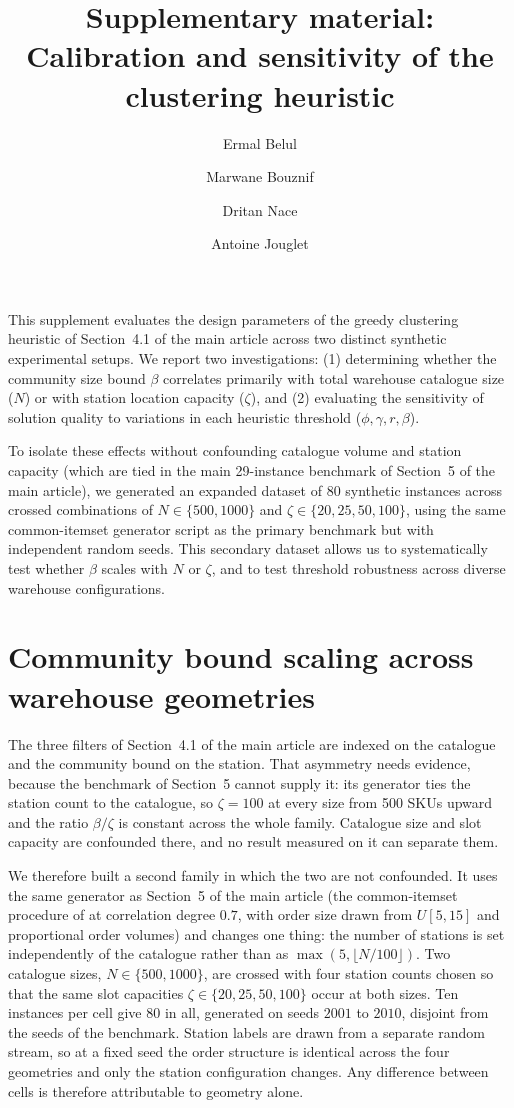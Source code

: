 \documentclass[11pt]{article}
\title{Supplementary material:\\
Calibration and sensitivity of the clustering heuristic}
\author{Ermal Belul \and Marwane Bouznif \and Dritan Nace \and Antoine Jouglet}
\date{}
\begin{document}
\maketitle

\noindent
This supplement evaluates the design parameters of the greedy clustering heuristic of
Section~4.1 of the main article across two distinct synthetic experimental setups. We report
two investigations: (1) determining whether the community size bound $\beta$ correlates
primarily with total warehouse catalogue size ($N$) or with station location capacity
($\zeta$), and (2) evaluating the sensitivity of solution quality to variations in each
heuristic threshold ($\phi, \gamma, r, \beta$).

To isolate these effects without confounding catalogue volume and station capacity (which are
tied in the main 29-instance benchmark of Section~5 of the main article), we generated an
expanded dataset of 80 synthetic instances across crossed combinations of $N \in \{500, 1000\}$
and $\zeta \in \{20, 25, 50, 100\}$, using the same common-itemset generator script as the
primary benchmark but with independent random seeds. This secondary dataset allows us to
systematically test whether $\beta$ scales with $N$ or $\zeta$, and to test threshold
robustness across diverse warehouse configurations.

\section{Community bound scaling across warehouse geometries}\label{sup:capsweep}
The three filters of Section~4.1 of the main article are indexed on the catalogue and the
community bound on the station. That asymmetry needs evidence, because the benchmark of
Section~5 cannot supply it: its generator ties the station count to the catalogue, so
$\zeta=100$ at every size from 500 SKUs upward and the ratio $\beta/\zeta$ is constant across
the whole family. Catalogue size and slot capacity are confounded there, and no result measured
on it can separate them.

We therefore built a second family in which the two are not confounded. It uses the same
generator as Section~5 of the main article (the common-itemset procedure of
\citet{zhang2019cie} at correlation degree $0.7$, with order size drawn from $U[5,15]$ and
proportional order volumes) and changes one thing: the number of stations is set independently
of the catalogue rather than as $\max(5,\lfloor N/100\rfloor)$. Two catalogue sizes,
$N\in\{500,1000\}$, are crossed with four station counts chosen so that the same slot
capacities $\zeta\in\{20,25,50,100\}$ occur at both sizes. Ten instances per cell give 80 in
all, generated on seeds $2001$ to $2010$, disjoint from the seeds of the benchmark. Station
labels are drawn from a separate random stream, so at a fixed seed the order structure is
identical across the four geometries and only the station configuration changes. Any difference
between cells is therefore attributable to geometry alone.
\end{document}
